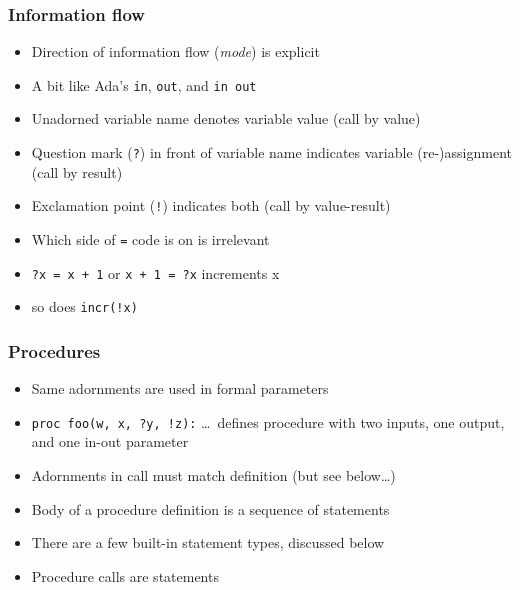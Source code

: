 \documentclass[12pt]{beamer}
\begin{document}
\begin{frame}[fragile]
\frametitle{Information flow}
\begin{itemize}
\item Direction of information flow (\emph{mode}) is explicit
\item A bit like Ada's \texttt{in}, \texttt{out}, and \texttt{in out}
\item Unadorned variable name denotes variable value (call by value)
\item Question mark (\texttt{?}) in front of variable name indicates
  variable (re-)assignment (call by result)
\item Exclamation point (\texttt{!}) indicates both (call by value-result)
\item Which side of \texttt{=} code is on is irrelevant
\item \texttt{?x = x + 1} or \texttt{x + 1 = ?x} increments x
\item so does \texttt{incr(!x)}
\end{itemize}
\end{frame}


\begin{frame}[fragile]
\frametitle{Procedures}
\begin{itemize}
\item Same adornments are used in formal parameters
\item \texttt{proc foo(w, x, ?y, !z):} \ldots\ defines procedure with two
  inputs, one output, and one in-out parameter
\item Adornments in call must match definition (but see below\ldots)
\item Body of a procedure definition is a sequence of
  statements
\item There are a few built-in statement types, discussed below
\item Procedure calls are statements
\end{itemize}
\end{frame}
\end{document}
